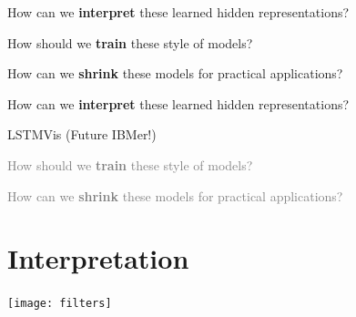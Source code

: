 \documentclass{beamer}
\let\tempone\itemize
\let\temptwo\enditemize
\renewenvironment{itemize}{\tempone\addtolength{\itemsep}{0.5\baselineskip}}{\temptwo}
\newcommand{\air}{\vspace{0.25cm}}
\newcommand{\Cite}[1]{{\footnotesize \citep{#1}}}
\begin{document}
\begin{frame}
  \centerline{}
  \air 
  \air

  \begin{itemize}
  \item How can we \textbf{interpret} these learned hidden representations? 
    \air 

    

  \item  How should we \textbf{train} these style of models? 
    \air 
  \item  How can we \textbf{shrink} these models for practical applications? 
  \end{itemize}
\end{frame}


\begin{frame}
  \centerline{}
  \air 
  \air

  \begin{itemize}
  \item How can we \textbf{interpret} these learned hidden representations? 

    \begin{center}
      \alert{LSTMVis} (Future IBMer!) 

      \Cite{Strobelt2016}
    \end{center}


    \air 

    

  \item  \textcolor{gray}{How should we \textbf{train} these style of models? \Cite{Wiseman2016a}}
    \air 
  \item  \textcolor{gray}{How can we \textbf{shrink} these models for practical applications? \Cite{Kim2016a}}
  \end{itemize}
\end{frame}

\section{Interpretation}

\begin{frame}
  \air 
  \texttt{[image: filters]}
  \begin{center}
     \Cite{DBLP:conf/eccv/ZeilerF14}
  \end{center}
\end{frame}

\end{document}
